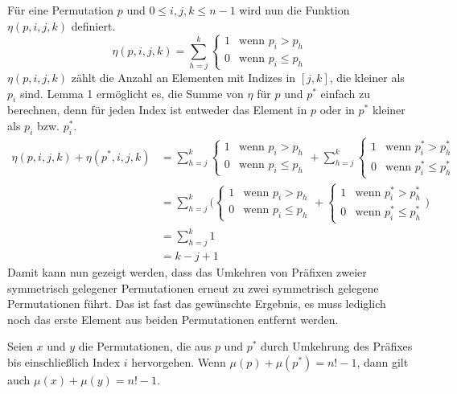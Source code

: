 \documentclass[a4paper, 11pt, ngerman]{article}
\begin{document}
Für eine Permutation $p$ und $0 \le i, j, k \le n - 1$ wird nun die Funktion $\eta(p, i, j, k)$ definiert.
$$
    \eta(p, i, j, k) = \sum_{h = j}^k
    \begin{cases}
        1 & \text{wenn } p_i > p_h   \\
        0 & \text{wenn } p_i \le p_h
    \end{cases}
$$
$\eta(p, i, j, k)$ zählt die Anzahl an Elementen mit Indizes in $[j, k]$, die kleiner als $p_i$ sind. Lemma 1 ermöglicht es, die Summe von $\eta$ für $p$ und $p^*$ einfach zu berechnen, denn für jeden Index ist entweder das Element in $p$ oder in $p^*$ kleiner als $p_i$ bzw. $p^*_i$.
\begin{align*}
    \eta(p, i, j, k) + \eta(p^*, i, j, k) & = \sum_{h = j}^k
    \begin{cases}
        1 & \text{wenn } p_i > p_h   \\
        0 & \text{wenn } p_i \le p_h
    \end{cases} + \sum_{h = j}^k
    \begin{cases}
        1 & \text{wenn } p^*_i > p^*_h   \\
        0 & \text{wenn } p^*_i \le p^*_h
    \end{cases}                                 \\
                                          & = \sum_{h = j}^k \Bigg (
    \begin{cases}
            1 & \text{wenn } p_i > p_h   \\
            0 & \text{wenn } p_i \le p_h
        \end{cases} +
    \begin{cases}
            1 & \text{wenn } p^*_i > p^*_h   \\
            0 & \text{wenn } p^*_i \le p^*_h
        \end{cases} \Bigg )                                 \\
                                          & = \sum_{h = j}^k 1       \\
                                          & = k - j + 1
\end{align*}
Damit kann nun gezeigt werden, dass das Umkehren von Präfixen zweier symmetrisch gelegener Permutationen erneut zu zwei symmetrisch gelegene Permutationen führt. Das ist fast das gewünschte Ergebnis, es muss lediglich noch das erste Element aus beiden Permutationen entfernt werden.
\begin{lemma}Seien $x$ und $y$ die Permutationen, die aus $p$ und $p^*$ durch Umkehrung des Präfixes bis einschließlich Index $i$ hervorgehen. Wenn $\mu(p) + \mu(p^*) = n! - 1$, dann gilt auch $\mu(x) + \mu(y) = n! - 1$.
\end{lemma}
\end{document}
